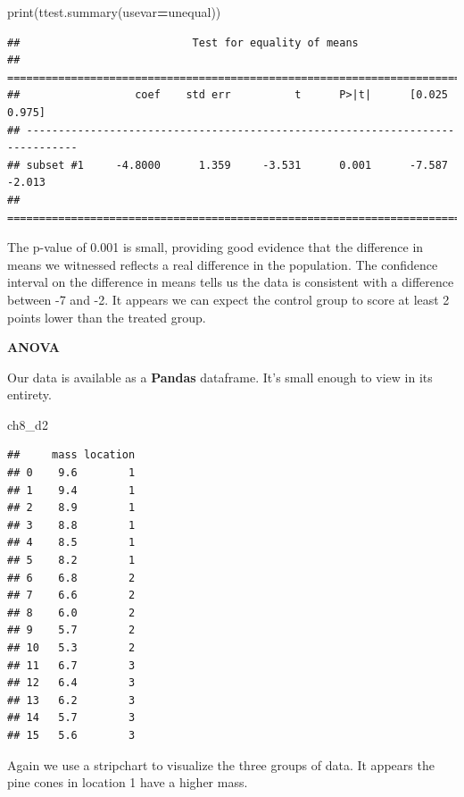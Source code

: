 \documentclass[
]{book}
\newenvironment{Shaded}{\begin{snugshade}}{\end{snugshade}}
\newcommand{\BuiltInTok}[1]{#1}
\newcommand{\NormalTok}[1]{#1}
\newcommand{\OperatorTok}[1]{\textcolor[rgb]{0.81,0.36,0.00}{\textbf{#1}}}
\newcommand{\StringTok}[1]{\textcolor[rgb]{0.31,0.60,0.02}{#1}}
\begin{document}
\begin{Shaded}
\begin{Highlighting}[]
\BuiltInTok{print}\NormalTok{(ttest.summary(usevar}\OperatorTok{=}\StringTok{\textquotesingle{}unequal\textquotesingle{}}\NormalTok{))}
\end{Highlighting}
\end{Shaded}

\begin{verbatim}
##                           Test for equality of means                          
## ==============================================================================
##                  coef    std err          t      P>|t|      [0.025      0.975]
## ------------------------------------------------------------------------------
## subset #1     -4.8000      1.359     -3.531      0.001      -7.587      -2.013
## ==============================================================================
\end{verbatim}

The p-value of 0.001 is small, providing good evidence that the difference in means we witnessed reflects a real difference in the population. The confidence interval on the difference in means tells us the data is consistent with a difference between -7 and -2. It appears we can expect the control group to score at least 2 points lower than the treated group.

\textbf{ANOVA}

Our data is available as a \textbf{Pandas} dataframe. It's small enough to view in its entirety.

\begin{Shaded}
\begin{Highlighting}[]
\NormalTok{ch8\_d2}
\end{Highlighting}
\end{Shaded}

\begin{verbatim}
##     mass location
## 0    9.6        1
## 1    9.4        1
## 2    8.9        1
## 3    8.8        1
## 4    8.5        1
## 5    8.2        1
## 6    6.8        2
## 7    6.6        2
## 8    6.0        2
## 9    5.7        2
## 10   5.3        2
## 11   6.7        3
## 12   6.4        3
## 13   6.2        3
## 14   5.7        3
## 15   5.6        3
\end{verbatim}

Again we use a stripchart to visualize the three groups of data. It appears the pine cones in location 1 have a higher mass.
\end{document}
